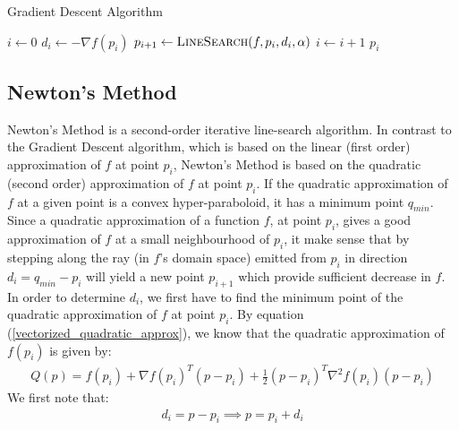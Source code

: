 \begin{algorithm}[ht]
  \caption{Gradient Descent Algorithm}
  \label{alg:gradient_descent_algorithm}
  \begin{algorithmic}[1]
      \State $i \leftarrow 0$
        \State $d_i \leftarrow -\nabla f \left(p_i\right)$
        \State $p_{i+1} \leftarrow \Call{LineSearch}{f, p_i, d_i, \alpha}$
        \State $i \leftarrow i + 1$
      \EndWhile
      \State \Return $p_i$
    \EndFunction
  \end{algorithmic}
\end{algorithm}

\subsection{Newton's Method}
Newton's Method is a second-order iterative line-search algorithm. In contrast to the Gradient Descent algorithm, which is based on the linear (first order) approximation of $f$ at point $p_i$, Newton's Method is based on the quadratic (second order) approximation of $f$ at point $p_i$. If the quadratic approximation of $f$ at a given point is a convex hyper-paraboloid, it has a minimum point $q_{min}$. Since a quadratic approximation of a function $f$, at point $p_i$, gives a good approximation of $f$ at a small neighbourhood of $p_i$, it make sense that by stepping along the ray (in $f$'s domain space) emitted from $p_i$ in direction $d_i = q_{min} - p_i$ will yield a new point $p_{i+1}$ which provide sufficient decrease in $f$.
In order to determine $d_i$, we first have to find the minimum point of the quadratic approximation of $f$ at point $p_i$. By equation (\ref{vectorized_quadratic_approx}), we know that the quadratic approximation of $f\left(p_i\right)$ is given by:
\begin{equation}\label{vectorized_quadratic_approx_p}
\begin{split}
Q\left(p\right) = f\left(p_i\right) + \nabla f\left(p_i\right)^T\left(p-p_i\right) + \frac{1}{2}\left(p-p_i\right)^T\nabla^2 f\left(p_i\right)\left(p-p_i\right)
\end{split}
\end{equation}
We first note that:
\begin{equation}\label{d_i_p_i_p}
\begin{split}
d_i = p - p_i \implies p = p_i + d_i
\end{split}
\end{equation}
